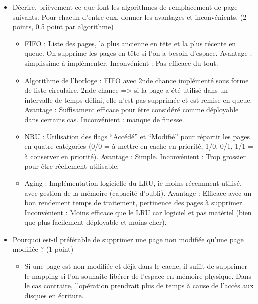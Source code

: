 \begin{correction}
\begin{itemize}
   \item D\'ecrire, bri\`evement ce que font les algorithmes de remplacement de page suivants. Pour chacun d'entre eux, donner les avantages et inconv\'enients. (2 points, 0.5 point par algorithme)
         \begin{itemize}
            \item FIFO : Liste des pages, la plus ancienne en tête et la plus r\'ecente en queue. On supprime les pages en tête si l'on a besoin d'espace. Avantage : simplissime à impl\'ementer. Inconv\'enient : Pas efficace du tout.
            \item Algorithme de l'horloge : FIFO avec 2nde chance impl\'ement\'e sous forme de liste circulaire. 2nde chance => si la page a \'et\'e utilis\'e dans un intervalle de temps d\'efini, elle n'est pas supprim\'ee et est remise en queue. Avantage : Suffisament efficace pour être consid\'er\'e comme d\'eployable dans certains cas. Inconv\'enient : manque de finesse.
            \item NRU : Utilisation des flags ``Acc\'ed\'e'' et ``Modifi\'e'' pour r\'epartir les pages en quatre cat\'egories (0/0 = à mettre en cache en priorit\'e, 1/0, 0/1, 1/1 = à conserver en priorit\'e). Avantage : Simple. Inconv\'enient : Trop grossier pour être r\'eellement utilisable.
            \item Aging : Impl\'ementation logicielle du LRU, ie moins r\'ecemment utilis\'e, avec gestion de la m\'emoire (capacit\'e d'oubli). Avantage : Efficace avec un bon rendement temps de traitement, pertinence des pages à supprimer. Inconv\'enient : Moins efficace que le LRU car logiciel et pas mat\'eriel (bien que plus facilement d\'eployable et moins cher).
         \end{itemize}
   \item Pourquoi est-il pr\'ef\'erable de supprimer une page non modifi\'ee qu'une page modifi\'ee ? (1 point)
   \begin{itemize}
        \item Si une page est non modifi\'ee et d\'ejà dans le cache, il suffit de supprimer le mapping si l'on souhaite lib\'erer de l'espace en m\'emoire physique. Dans le cas contraire, l'op\'eration prendrait plus de temps à cause de l'acc\`es aux disques en \'ecriture.
   \end{itemize}
\end{itemize}


\end{correction}

%
%

